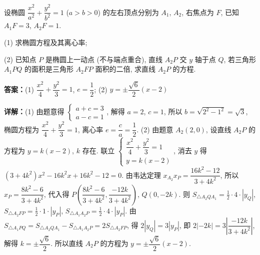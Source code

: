 \begin{question}[points=15]
设椭圆 $\dfrac{x^2}{a^2} + \dfrac{y^2}{b^2} = 1$ ($a > b > 0$) 的左右顶点分别为 $A_1$, $A_2$, 右焦点为 $F$, 已知 $A_1F = 3$, $A_2F = 1$.

(1) 求椭圆方程及其离心率;

(2) 已知点 $P$ 是椭圆上一动点 (不与端点重合), 直线 $A_2P$ 交 $y$ 轴于点 $Q$, 若三角形 $A_1PQ$ 的面积是三角形 $A_2FP$ 面积的二倍, 求直线 $A_2P$ 的方程.
\begin{solution}
\textbf{答案：}(1) $\dfrac{x^2}{4} + \dfrac{y^2}{3} = 1$, $e = \dfrac{1}{2}$; (2) $y = \pm \dfrac{\sqrt{6}}{2}(x-2)$

\textbf{详解：}(1) 由题意得 $\begin{cases} a + c = 3 \\ a - c = 1 \end{cases}$, 解得 $a=2$, $c=1$, 所以 $b = \sqrt{2^2 - 1^2} = \sqrt{3}$, 椭圆方程为 $\dfrac{x^2}{4} + \dfrac{y^2}{3} = 1$, 离心率 $e = \dfrac{c}{a} = \dfrac{1}{2}$.
(2) 由题意 $A_2(2,0)$, 设直线 $A_2P$ 的方程为 $y = k(x-2)$, $k$ 存在. 联立 $\begin{cases} \dfrac{x^2}{4} + \dfrac{y^2}{3} = 1 \\ y = k(x-2) \end{cases}$, 消去 $y$ 得 $(3+4k^2)x^2 - 16k^2 x + 16k^2 - 12 = 0$. 由韦达定理 $x_{A_2} x_P = \dfrac{16k^2 - 12}{3+4k^2}$, 所以 $x_P = \dfrac{8k^2 - 6}{3+4k^2}$, 代入得 $P\left(\dfrac{8k^2 - 6}{3+4k^2}, \dfrac{-12k}{3+4k^2}\right)$, $Q(0, -2k)$. 则 $S_{\triangle A_2QA_1} = \frac{1}{2} \cdot 4 \cdot |y_Q|$, $S_{\triangle A_2FP} = \frac{1}{2} \cdot 1 \cdot |y_P|$, $S_{\triangle A_1A_2P} = \frac{1}{2} \cdot 4 \cdot |y_P|$. 由 $S_{\triangle A_1PQ} = S_{\triangle A_2QA_1} - S_{\triangle A_1A_2P} = 2S_{\triangle A_2FP}$, 得 $2|y_Q| = 3|y_P|$, 即 $2|-2k| = 3\left|\dfrac{-12k}{3+4k^2}\right|$, 解得 $k = \pm \dfrac{\sqrt{6}}{2}$. 所以直线 $A_2P$ 的方程为 $y = \pm \dfrac{\sqrt{6}}{2}(x-2)$.
\end{solution}
\end{question}

